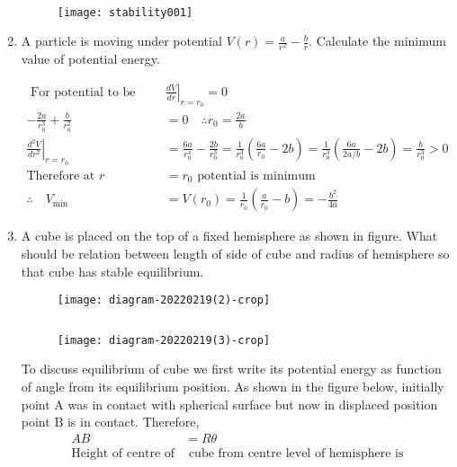 \begin{enumerate}
\begin{answer}
\begin{align*}
		\end{align*}
		\begin{figure}[H]
			\centering
			\texttt{[image: stability001]}
		\end{figure}
	\end{answer}
	\item  A particle is moving under potential $V(r)=\frac{a}{r^{2}}-\frac{b}{r} .$ Calculate the minimum value of potential energy.
	\begin{answer}
		\begin{align*}
	\text{	For potential to be minimum }&\left.\frac{d V}{d r}\right|_{r=r_{0}}=0\\
	 -\frac{2 a}{r_{0}^{3}}+\frac{b}{r_{0}^{2}}&=0 \quad \therefore r_{0}=\frac{2 a}{b}\\
	 \left.\frac{d^{2} V}{d r^{2}}\right|_{r=r_{0}}&=\frac{6 a}{r_{0}^{4}}-\frac{2 b}{r_{0}^{3}}=\frac{1}{r_{0}^{3}}\left(\frac{6 a}{r_{0}}-2 b\right)=\frac{1}{r_{0}^{3}}\left(\frac{6 a}{2 a / b}-2 b\right)=\frac{b}{r_{0}^{3}}>0\\
	 \text{Therefore at }r&=r_{0}\text{ potential is minimum}\\
	 \therefore \quad V_{\min }&=V\left(r_{0}\right)=\frac{1}{r_{0}}\left(\frac{a}{r_{0}}-b\right)=-\frac{b^{2}}{4 a}
		\end{align*}
	\end{answer}
	\item  A cube is placed on the top of a fixed hemisphere as shown in figure. What should be relation between length of side of cube and radius of hemisphere so that cube has stable equilibrium.
		\begin{figure}[H]
		\centering
		\texttt{[image: diagram-20220219(2)-crop]}
	\end{figure}
	\begin{answer}
		$\left. \right. $
		\begin{figure}[H]
			\centering
			\texttt{[image: diagram-20220219(3)-crop]}
		\end{figure}
		To discuss equilibrium of cube we first write its potential energy as function of angle from its equilibrium position. As shown in the figure below, initially point A was in contact with spherical surface but now in displaced position point $\mathrm{B}$ is in contact. Therefore,
		\begin{align*}
		A B&=R \theta\\
		\text{Height of centre of}&\text{ cube from centre level of hemisphere is}\\

\end{align*}
\end{answer}
\end{enumerate}
